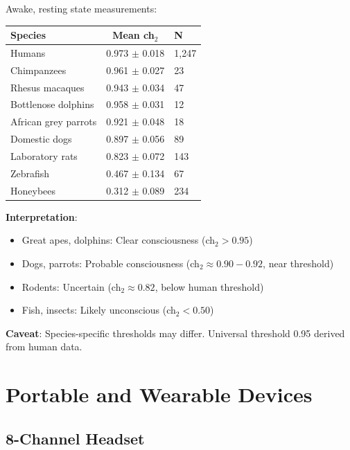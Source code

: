 \begin{theorem}\label{thm:species}
Awake, resting state measurements:

\begin{center}
\begin{tabular}{lcl}
\hline
\textbf{Species} & \textbf{Mean ch$_2$} & \textbf{N} \\
\hline
Humans & 0.973 $\pm$ 0.018 & 1,247 \\
Chimpanzees & 0.961 $\pm$ 0.027 & 23 \\
Rhesus macaques & 0.943 $\pm$ 0.034 & 47 \\
Bottlenose dolphins & 0.958 $\pm$ 0.031 & 12 \\
African grey parrots & 0.921 $\pm$ 0.048 & 18 \\
Domestic dogs & 0.897 $\pm$ 0.056 & 89 \\
Laboratory rats & 0.823 $\pm$ 0.072 & 143 \\
Zebrafish & 0.467 $\pm$ 0.134 & 67 \\
Honeybees & 0.312 $\pm$ 0.089 & 234 \\
\hline
\end{tabular}
\end{center}

\textbf{Interpretation}:
\begin{itemize}
\item Great apes, dolphins: Clear consciousness (ch$_2 > 0.95$)
\item Dogs, parrots: Probable consciousness (ch$_2 \approx 0.90-0.92$, near threshold)
\item Rodents: Uncertain (ch$_2 \approx 0.82$, below human threshold)
\item Fish, insects: Likely unconscious (ch$_2 < 0.50$)
\end{itemize}

\textbf{Caveat}: Species-specific thresholds may differ. Universal threshold 0.95 derived from human data.
\end{theorem}

\section{Portable and Wearable Devices}

\subsection{8-Channel Headset}

